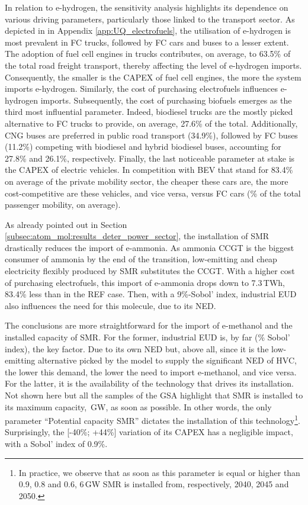 In relation to e-hydrogen, the sensitivity analysis highlights its dependence on various driving parameters, particularly those linked to the transport sector. As depicted in  in Appendix \ref{app:UQ_electrofuels}, the utilisation of e-hydrogen is most prevalent in \gls{FC} trucks, followed by \gls{FC} cars and buses to a lesser extent. The adoption of fuel cell engines in trucks contributes, on average, to 63.5\% of the total road freight transport, thereby affecting the level of e-hydrogen imports. Consequently, the smaller is the CAPEX of fuel cell engines, the more the system imports e-hydrogen. Similarly, the cost of purchasing electrofuels influences e-hydrogen imports. Subsequently, the cost of purchasing biofuels emerges as the third most influential parameter. Indeed, biodiesel trucks are the mostly picked alternative to \gls{FC} trucks to provide, on average, 27.6\% of the total. Additionally, \gls{CNG} buses are preferred in public road transport (34.9\%), followed by \gls{FC} buses (11.2\%) competing with biodiesel and hybrid biodiesel buses, accounting for 27.8\% and 26.1\%, respectively. Finally, the last noticeable parameter at stake is the CAPEX of electric vehicles. In competition with \gls{BEV} that stand for 83.4\% on average of the private mobility sector, the cheaper these cars are, the more cost-competitive are these vehicles, and vice versa, versus \gls{FC} cars (\% of the total passenger mobility, on average).

As already pointed out in Section \ref{subsec:atom_mol:results_deter_power_sector}, the installation of \gls{SMR} drastically reduces the import of e-ammonia. As ammonia \gls{CCGT} is the biggest consumer of ammonia by the end of the transition, low-emitting and cheap electricity flexibly produced by \gls{SMR} substitutes the \gls{CCGT}. With a higher cost of purchasing electrofuels, this import of e-ammonia drops down to 7.3\,TWh, 83.4\% less than in the REF case. Then, with a 9\%-Sobol' index, industrial \gls{EUD} also influences the need for this molecule, due to its \gls{NED}.

The conclusions are more straightforward for the import of e-methanol and the installed capacity of \gls{SMR}. For the former, industrial \gls{EUD} is, by far (\% Sobol' index), the key factor. Due to its own \gls{NED} but, above all, since it is the low-emitting alternative picked by the model to supply the significant \gls{NED} of \gls{HVC}, the lower this demand, the lower the need to import e-methanol, and vice versa. For the latter, it is the availability of the technology that drives its installation. Not shown here but all the samples of the \gls{GSA} highlight that \gls{SMR} is installed to its maximum capacity, \,GW, as soon as possible. In other words, the only parameter ``Potential capacity \gls{SMR}'' dictates the installation of this technology\footnote{In practice, we observe that as soon as this parameter is equal or higher than 0.9, 0.8 and 0.6, 6\,GW \gls{SMR} is installed from, respectively, 2040, 2045 and 2050.}. Surprisingly, the [-40\%; +44\%]  variation of its CAPEX has a negligible impact, with a Sobol' index of 0.9\%.

